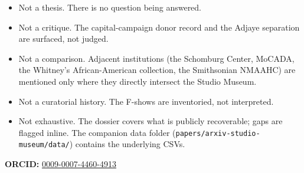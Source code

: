 \documentclass[10pt,letterpaper,twocolumn]{article}
\begin{document}
\begin{itemize}
  \item Not a thesis. There is no question being answered.
  \item Not a critique. The capital-campaign donor record and the Adjaye separation are surfaced, not judged.
  \item Not a comparison. Adjacent institutions (the Schomburg Center, MoCADA, the Whitney's African-American collection, the Smithsonian NMAAHC) are mentioned only where they directly intersect the Studio Museum.
  \item Not a curatorial history. The F-shows are inventoried, not interpreted.
  \item Not exhaustive. The dossier covers what is publicly recoverable; gaps are flagged inline. The companion data folder (\texttt{papers/arxiv-studio-museum/data/}) contains the underlying CSVs.
\end{itemize}

\vspace{0.5em}
\noindent\textbf{ORCID:} \href{https://orcid.org/0009-0007-4460-4913}{0009-0007-4460-4913}



\end{document}
